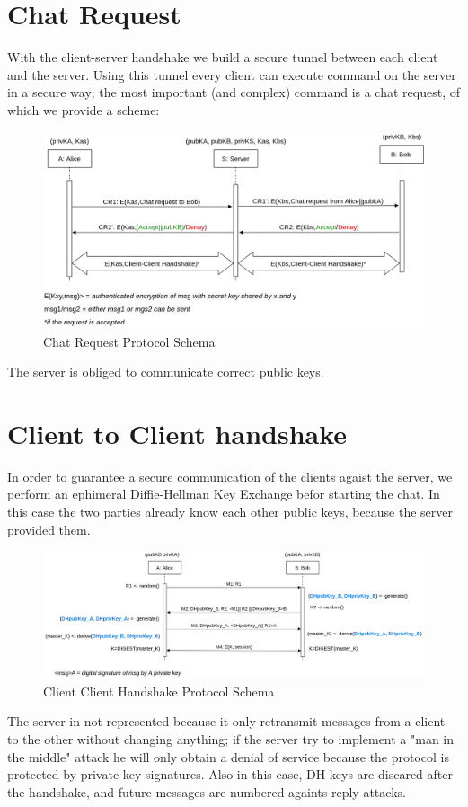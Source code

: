 \documentclass[11pt]{report}
\begin{document}
\section{Chat Request}
With the client-server handshake we build a secure tunnel between each client and the server. Using this 
tunnel every client can execute command on the server in a secure way; the most important (and complex) command
is a chat request, of which we provide a scheme:
\begin{figure}[H]
	\centering
	\includegraphics[scale=0.2]{img/ChatRequest.png}
	\caption{Chat Request Protocol Schema}
	\label {img: ChatRequest}
\end{figure}
The server is obliged to communicate correct public keys.
\section{Client to Client handshake}
In order to guarantee a secure communication of the clients agaist the server, we perform an ephimeral 
Diffie-Hellman Key Exchange befor starting the chat. In this case the two parties already know each other
public keys, because the server provided them. 
\begin{figure}[H]
	\centering
	\includegraphics[scale=0.19]{img/AuthClientClient.png}
	\caption{Client Client Handshake Protocol Schema}
	\label {img: AuthClientClient}
\end{figure}
The server in not represented because it only retransmit messages from a client to the other without changing
anything; if the server try to implement a "man in the middle" attack he will only obtain a denial of service
because the protocol is protected by private key signatures. Also in this case, DH keys are discared after 
the handshake, and future messages are numbered againts reply attacks.
\end{document}
